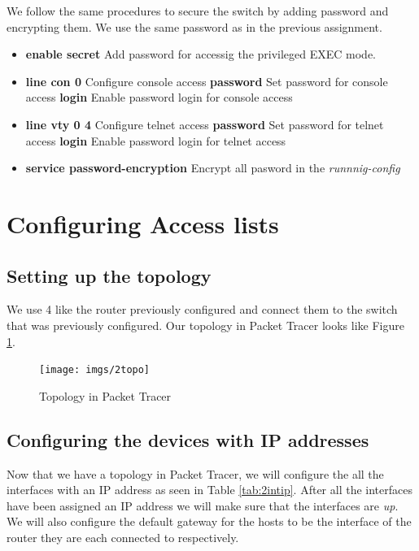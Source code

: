 \documentclass{article}
\begin{document}
We follow the same procedures to secure the switch by adding password and encrypting them. We use the same password as in the previous assignment.

\begin{itemize}
    \item \textbf{enable secret} Add password for accessig the privileged EXEC mode.
    \item \textbf{line con 0} Configure console access 
        \subitem \textbf{password} Set password for console access
        \subitem \textbf{login} Enable password login for console access
    \item \textbf{line vty 0 4} Configure telnet access
        \subitem \textbf{password} Set password for telnet access
        \subitem \textbf{login} Enable password login for telnet access
     \item \textbf{service password-encryption} Encrypt all pasword in the \textit{runnnig-config}
\end{itemize}

\section{Configuring Access lists}


\subsection{Setting up the topology}

We use 4 like the router previously configured and connect them to the switch that was previously configured. Our topology in Packet Tracer looks like Figure \ref{fig:2topo}.

\begin{figure}[h]
\centering
\texttt{[image: imgs/2topo]}
\caption{Topology in Packet Tracer}
\label{fig:2topo}
\end{figure}

\subsection{Configuring the devices with IP addresses}

Now that we have a topology in Packet Tracer, we will configure the all the interfaces with an IP address as seen in Table \ref{tab:2intip}. After all the interfaces have been assigned an IP address we will make sure that the interfaces are \textit{up}. We will also configure the default gateway for the hosts to be the interface of the router they are each connected to respectively.
\end{document}
